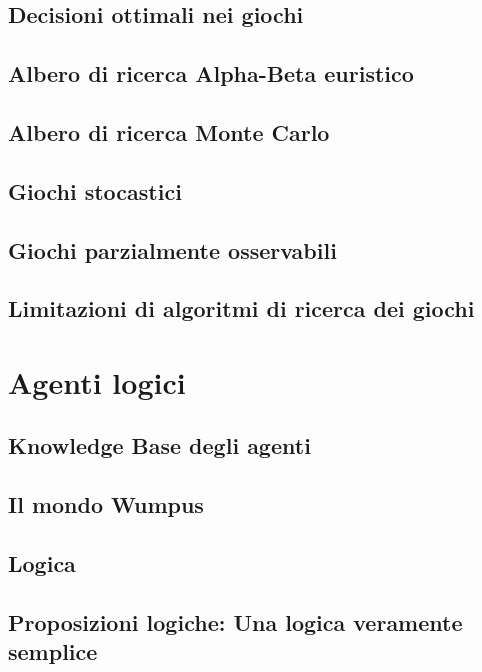 \documentclass[a4paper]{extarticle}
\begin{document}
\subsection{Decisioni ottimali nei giochi}

\subsection{Albero di ricerca Alpha-Beta euristico}

\subsection{Albero di ricerca Monte Carlo}

\subsection{Giochi stocastici}

\subsection{Giochi parzialmente osservabili}

\subsection{Limitazioni di algoritmi di ricerca dei giochi}

\newpage

\section{Agenti logici}

\subsection{Knowledge Base degli agenti}

\subsection{Il mondo Wumpus}

\subsection{Logica}

\subsection{Proposizioni logiche: Una logica veramente semplice}
\end{document}
